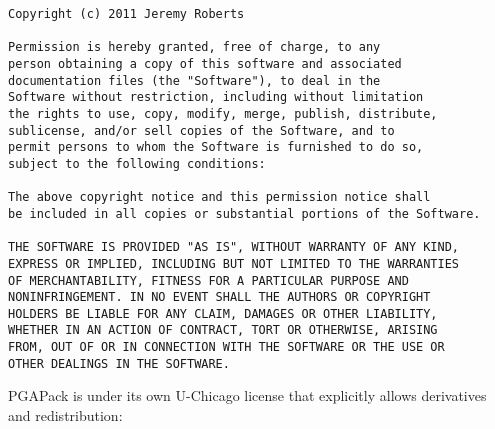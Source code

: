 \documentclass[letterpaper,11pt,english]{sphinxmanual}
\begin{document}
\begin{Verbatim}[commandchars=\\\{\}]
Copyright (c) 2011 Jeremy Roberts

Permission is hereby granted, free of charge, to any 
person obtaining a copy of this software and associated 
documentation files (the "Software"), to deal in the 
Software without restriction, including without limitation 
the rights to use, copy, modify, merge, publish, distribute, 
sublicense, and/or sell copies of the Software, and to 
permit persons to whom the Software is furnished to do so, 
subject to the following conditions:

The above copyright notice and this permission notice shall 
be included in all copies or substantial portions of the Software.

THE SOFTWARE IS PROVIDED "AS IS", WITHOUT WARRANTY OF ANY KIND, 
EXPRESS OR IMPLIED, INCLUDING BUT NOT LIMITED TO THE WARRANTIES 
OF MERCHANTABILITY, FITNESS FOR A PARTICULAR PURPOSE AND 
NONINFRINGEMENT. IN NO EVENT SHALL THE AUTHORS OR COPYRIGHT 
HOLDERS BE LIABLE FOR ANY CLAIM, DAMAGES OR OTHER LIABILITY, 
WHETHER IN AN ACTION OF CONTRACT, TORT OR OTHERWISE, ARISING 
FROM, OUT OF OR IN CONNECTION WITH THE SOFTWARE OR THE USE OR 
OTHER DEALINGS IN THE SOFTWARE.
\end{Verbatim}

PGAPack is under its own U-Chicago license that explicitly allows derivatives and redistribution:
\end{document}

